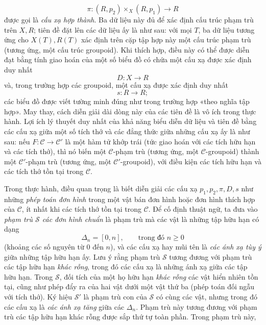 \[
  \pi:(R,p_2)\times_X(R,p_1)\longrightarrow R
\]
được gọi là \emph{cấu xạ hợp thành}. Ba dữ liệu này đủ để xác định cấu trúc
phạm trù trên $X,R$; tiên đề đặt lên các dữ liệu ấy là như sau: với mọi $T$,
ba dữ liệu tương ứng cho $X(T),R(T)$ xác định trên cặp tập hợp này một cấu
trúc phạm trù (tương ứng, một cấu trúc groupoid). Khi thích hợp, điều này có
thể được diễn đạt bằng tính giao hoán của một số biểu đồ có chứa một cấu xạ
được xác định duy nhất
\[
  D:X\longrightarrow R
\]
và, trong trường hợp các groupoid, một cấu xạ được xác định duy nhất
\[
  s:R\longrightarrow R;
\]
các biểu đồ được viết tường minh đúng như trong trường hợp «theo nghĩa tập
hợp». May thay, cách diễn giải dài dòng này của các tiên đề là vô ích trong
thực hành. Lợi ích lý thuyết duy nhất của khả năng biểu diễn dữ liệu và tiên
đề bằng các cấu xạ giữa một số tích thớ và các đẳng thức giữa những cấu xạ ấy
là như sau: nếu $F:\mathcal C\to\mathcal C'$ là một hàm tử khớp trái (tức giao
hoán với các tích hữu hạn và các tích thớ), thì nó biến một
$\mathcal C$-phạm trù (tương ứng, một $\mathcal C$-groupoid) thành một
$\mathcal C'$-phạm trù (tương ứng, một $\mathcal C'$-groupoid), với điều kiện
các tích hữu hạn và các tích thớ tồn tại trong $\mathcal C$.

Trong thực hành, điều quan trọng là biết diễn giải các cấu xạ
$p_1,p_2,\pi,D,s$ như những \emph{phép toán đơn hình} trong một vật bán đơn
hình hoặc đơn hình thích hợp của $\mathcal C$, ít nhất khi các tích thớ tồn
tại trong $\mathcal C$. Để cố định thuật ngữ, ta đưa vào \emph{phạm trù
$\mathcal S$ các đơn hình chuẩn} là phạm trù mà các vật là những tập hữu hạn
có dạng
\[
  \Delta_n=[0,n],\qquad\text{trong đó }n\geq 0
\]
(khoảng các số nguyên từ $0$ đến $n$), và các cấu xạ hay mũi tên là
\emph{các ánh xạ tùy ý} giữa những tập hữu hạn ấy. Lưu ý rằng phạm trù
$\mathcal S$ tương đương với phạm trù các tập hữu hạn \emph{khác rỗng}, trong
đó các cấu xạ là những ánh xạ giữa các tập hữu hạn. Trong $\mathcal S$, đối
tích của một họ hữu hạn \emph{khác rỗng} các vật hiển nhiên tồn tại, cũng như
phép đẩy ra của hai vật dưới một vật thứ ba (phép toán đối ngẫu với tích thớ).
Ký hiệu $\mathcal S'$ là phạm trù con của $\mathcal S$ có cùng các vật, nhưng
trong đó các cấu xạ là \emph{các ánh xạ tăng} giữa các $\Delta_n$. Phạm trù
này tương đương với phạm trù các tập hữu hạn khác rỗng được sắp thứ tự toàn
phần. Trong phạm trù này,
